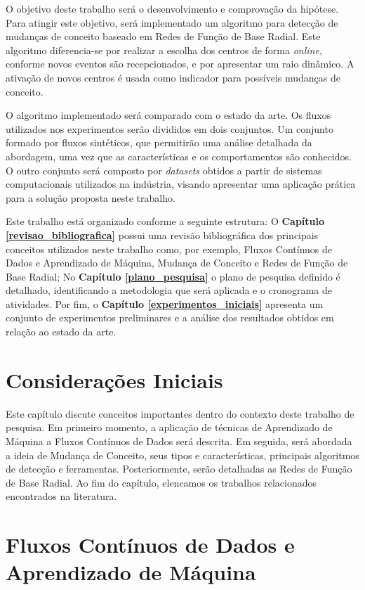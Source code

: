 \documentclass[qual, classic, a4paper]{ufbathesis}
\begin{document}
O objetivo deste trabalho será o desenvolvimento e comprovação da hipótese.
Para atingir este objetivo, será implementado um algoritmo para detecção de mudanças de conceito baseado em Redes de Função de Base Radial. 
Este algoritmo diferencia-se por realizar a escolha dos centros de forma \textit{online}, conforme novos eventos são recepcionados, 
e por apresentar um raio dinâmico. 
A ativação de novos centros é usada como indicador para possíveis mudanças de conceito.

O algoritmo implementado será comparado com o estado da arte. 
Os fluxos utilizados nos experimentos serão divididos em dois conjuntos. 
Um conjunto formado por fluxos sintéticos, que permitirão uma análise detalhada da abordagem, uma vez que as características e os comportamentos são conhecidos. 
O outro conjunto será composto por \textit{datasets} obtidos a partir de sistemas computacionais utilizados na indústria,
visando apresentar uma aplicação prática para a solução proposta neste trabalho.


Este trabalho está organizado conforme a seguinte estrutura: 
O \textbf{Capítulo \ref{revisao_bibliografica}} possui uma revisão bibliográfica dos principais conceitos utilizados neste trabalho como, 
por exemplo, Fluxos Contínuos de Dados e Aprendizado de Máquina, Mudança de Conceito e Redes de Função de Base Radial; 
No \textbf{Capítulo \ref{plano_pesquisa}} o plano de pesquisa definido é detalhado, 
identificando a metodologia que será aplicada e o cronograma de atividades. 
Por fim, o \textbf{Capítulo \ref{experimentos_iniciais}} 
apresenta um conjunto de experimentos preliminares e a análise dos resultados obtidos em relação ao estado da arte.

 \label{revisao_bibliografica}
\section{Considerações Iniciais}

Este capítulo discute conceitos importantes dentro do contexto deste trabalho de pesquisa.
Em primeiro momento, a aplicação de técnicas de Aprendizado de Máquina a Fluxos Contínuos de Dados será descrita.
Em seguida, será abordada a ideia de Mudança de Conceito, seus tipos e características, principais algoritmos de detecção e ferramentas.
Posteriormente, serão detalhadas as Redes de Função de Base Radial.
Ao fim do capítulo, elencamos os trabalhos relacionados encontrados na literatura.


\section{Fluxos Contínuos de Dados e Aprendizado de Máquina}
\end{document}
